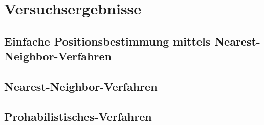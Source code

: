 \chapter{Versuchsergebnisse}
\label{chap:testing}

\section{Einfache Positionsbestimmung mittels Nearest-Neighbor-Verfahren}
\label{sec:testing:simplepositioning}


\section{Nearest-Neighbor-Verfahren}
\label{sec:testing:nearestneighbor}

\section{Prohabilistisches-Verfahren}
\label{sec:testing:prohabilistic}
